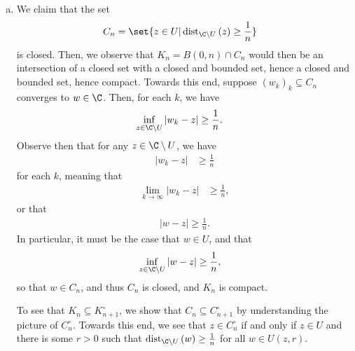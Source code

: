 \documentclass[10pt]{mypackage}
\begin{document}
\begin{solution}\hfill
  \begin{enumerate}[(a)]
    \item We claim that the set
      \begin{align*}
        C_n &= \set{z\in U | \operatorname{dist}_{\C\setminus U}\left( z \right) \geq \frac{1}{n}}
      \end{align*}
      is closed. Then, we observe that $K_n = B\left( 0,n \right) \cap C_n$ would then be an intersection of a closed set with a closed and bounded set, hence a closed and bounded set, hence compact. Towards this end, suppose $\left( w_k \right)_k\subseteq C_n$ converges to $w\in \C$. Then, for each $k$, we have
      \begin{align*}
        \inf_{z\in \C\setminus U}\left\vert w_k - z \right\vert &\geq \frac{1}{n}.
      \end{align*}
      Observe then that for any $z\in \C\setminus U$, we have
      \begin{align*}
        \left\vert w_k-z \right\vert &\geq \frac{1}{n}
      \end{align*}
      for each $k$, meaning that
      \begin{align*}
        \lim_{k\rightarrow\infty} \left\vert w_k - z \right\vert &\geq \frac{1}{n},
      \end{align*}
      or that
      \begin{align*}
        \left\vert w-z \right\vert\geq \frac{1}{n}.
      \end{align*}
      In particular, it must be the case that $w\in U$, and that
      \begin{align*}
        \inf_{z\in \C\setminus U} \left\vert w-z \right\vert &\geq \frac{1}{n},
      \end{align*}
      so that $w\in C_n$, and thus $C_n$ is closed, and $K_n$ is compact.\newline

      To see that $K_n\subseteq K_{n+1}^{\circ}$, we show that $C_n\subseteq C_{n+1}^{\circ}$ by understanding the picture of $C_{n}^{\circ}$. Towards this end, we see that $z\in C_n^{\circ}$ if and only if $z\in U$ and there is some $r > 0$ such that $\operatorname{dist}_{\C\setminus U}\left( w \right) \geq \frac{1}{n}$ for all $w\in U\left( z,r \right)$.\newline


\end{enumerate}
\end{solution}
\end{document}
